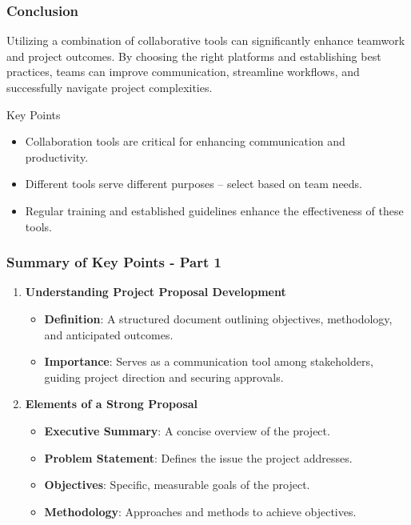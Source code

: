 \documentclass[aspectratio=169]{beamer}
\begin{document}
\begin{frame}[fragile]
    \frametitle{Conclusion}
    Utilizing a combination of collaborative tools can significantly enhance teamwork and project outcomes. By choosing the right platforms and establishing best practices, teams can improve communication, streamline workflows, and successfully navigate project complexities.

    \begin{block}{Key Points}
        \begin{itemize}
            \item Collaboration tools are critical for enhancing communication and productivity.
            \item Different tools serve different purposes – select based on team needs.
            \item Regular training and established guidelines enhance the effectiveness of these tools.
        \end{itemize}
    \end{block}
\end{frame}

\begin{frame}[fragile]
    \frametitle{Summary of Key Points - Part 1}
    \begin{enumerate}
        \item \textbf{Understanding Project Proposal Development}
        \begin{itemize}
            \item \textbf{Definition}: A structured document outlining objectives, methodology, and anticipated outcomes.
            \item \textbf{Importance}: Serves as a communication tool among stakeholders, guiding project direction and securing approvals.
        \end{itemize}

        \item \textbf{Elements of a Strong Proposal}
        \begin{itemize}
            \item \textbf{Executive Summary}: A concise overview of the project.
            \item \textbf{Problem Statement}: Defines the issue the project addresses.
            \item \textbf{Objectives}: Specific, measurable goals of the project.
            \item \textbf{Methodology}: Approaches and methods to achieve objectives.
        \end{itemize}
    \end{enumerate}
\end{frame}
\end{document}
